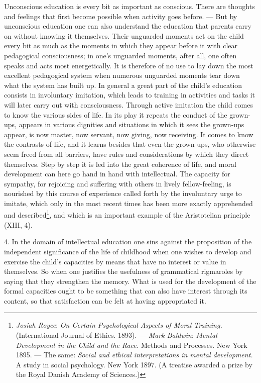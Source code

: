 \documentclass[12pt,a4paper,openany]{book}
\newcommand{\opage}[1]{\marginnote{\footnotesize\textit{[#1]}}}
\begin{document}
Unconscious education is every bit as important as conscious. There are thoughts and feelings that first become possible
when activity goes before. --- But by unconscious education one can also understand the education that parents carry on
without knowing it themselves. Their unguarded moments act on the child every bit as much as the moments in which they
appear before it with clear pedagogical consciousness; in one's unguarded moments, after all, one often speaks and acts
most energetically. It is therefore of no use to lay down the most excellent pedagogical system when numerous unguarded
moments tear down what the system has built up. In general a great part of the child's education consists in involuntary
imitation, which leads to training in activities and tasks it will later carry out with consciousness. Through active
imitation the child comes to know the various sides of life. In its play it repeats the conduct of the grown-ups,
appears in various dignities and situations in which it sees the grown-ups appear, is now master, now servant, now
giving, now receiving. It comes to know the contrasts of life, and it learns besides that even the grown-ups, who
otherwise seem freed from all barriers, have rules and considerations by which they direct themselves. Step by step it
is led into the great coherence of life, and moral development can here go hand in hand with intellectual. The capacity
for sympathy, for rejoicing and suffering with others in lively fellow-feeling, is nourished by this course of
experience called forth by the involuntary urge to imitate, which only in the most recent times has been more exactly
apprehended and described\footnote[1]{\emph{Josiah Royce}: \textit{On Certain Psychological Aspects of Moral Training.}
(International Journal of Ethics. 1893). --- \emph{Mark Baldwin}: \textit{Mental Development in the Child and the Race.}
Methods and Processes. New York 1895. --- The same: \textit{Social and ethical interpretations in mental development.} A
study in social psychology. New York 1897. (A treatise awarded a prize by the Royal Danish Academy of Sciences.)}, and
which is an important example of the Aristotelian principle (XIII, 4).

4. In the domain of intellectual education one sins
\opage{334}against the proposition of the independent significance of the life of childhood when one wishes to develop
and exercise the child's capacities by means that have no interest or value in themselves. So when one justifies the
usefulness of grammatical rigmaroles by saying that they strengthen the memory. What is used for the development of the
formal capacities ought to be something that can also have interest through its content, so that satisfaction can be
felt at having appropriated it.
\end{document}
